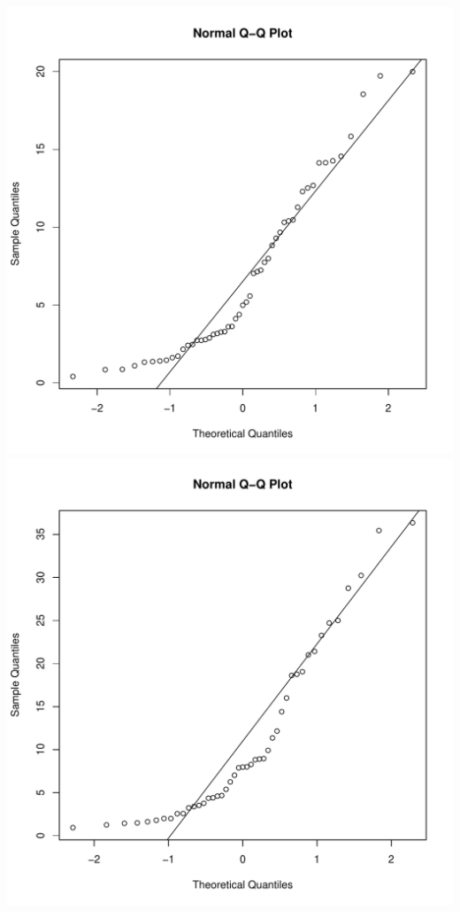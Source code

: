 \documentclass{article}\usepackage{graphicx, color}
\newenvironment{knitrout}{}{} %
\begin{document}
\begin{enumerate}
\begin{shaded}
\begin{knitrout}
{\centering \includegraphics[width=.45\textwidth]{figure/unnamed-chunk-21} \includegraphics[width=.45\textwidth]{figure/unnamed-chunk-22} 

}


\end{knitrout}



\end{shaded}
\end{enumerate}
\end{document}

